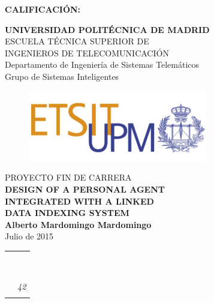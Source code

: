 {\large{\bf CALIFICACIÓN:}}
\pagestyle{empty}
\cleardoublepage
\vspace*{\baselineskip}
\begin{center}
	{\LARGE\rm\textbf{UNIVERSIDAD POLITÉCNICA DE MADRID}\\
	\vspace{1.0cm}
	 ESCUELA TÉCNICA SUPERIOR DE\\ INGENIEROS DE TELECOMUNICACIÓN
	  }  \\

	 {\Large\rm Departamento de Ingeniería de Sistemas Telemáticos\\
	 Grupo de Sistemas Inteligentes  }  \\

\begin{figure}[!htbp]
	\centering
    \includegraphics[width=0.7\textwidth]{img/logos/logo_etsit.jpg}

\end{figure}
	\vspace{1.0cm}
	{{\LARGE\rm PROYECTO FIN DE CARRERA\\
	\vspace{2.0cm}
	 \textbf{DESIGN OF A PERSONAL AGENT}\\	 
	 \textbf{INTEGRATED WITH A LINKED}\\ 
	 \vspace{0.5cm}
	 \textbf{DATA INDEXING SYSTEM} }}  \\
	 
	 \vspace{1.0cm}
     \Large\rm\textbf{Alberto Mardomingo Mardomingo}\\
	 \vspace{1.0cm}
	 Julio de 2015
\end{center}  

\cleardoublepage

\begin{tabular}{p{10cm}p{4cm}}
&\\
&\\
&\\
&\\
&\\
&\\
&\\
&\\
&\\
&\emph{42}\\
&\\
\end{tabular}
